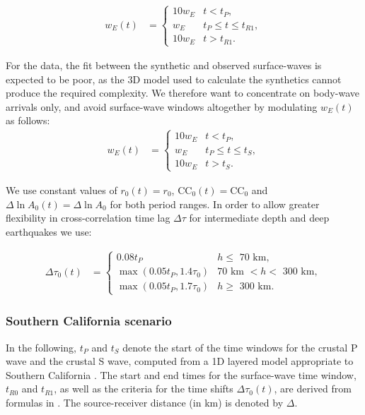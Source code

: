 %
\begin{align}
w_E(t) & =
  \begin{cases}
    10 w_E & \text{$t < t_P$}, \\
    w_E & \text{$t_P \le t \leq t_{R1}$}, \\
    10 w_E & \text{$t > t_{R1}$}.
  \end{cases}
\end{align}

For the  data, the fit between the synthetic and observed surface-waves is expected to be poor, as the 3D model used to calculate the synthetics cannot produce the required complexity. We therefore want to concentrate on body-wave arrivals only, and avoid surface-wave windows altogether by modulating $w_E(t)$ as follows:
%
\begin{align}
w_E(t) & =
  \begin{cases}
    10 w_E & \text{$t < t_P$}, \\
    w_E & \text{$t_P \le t \leq t_S$}, \\
    10 w_E & \text{$t > t_S$}.
  \end{cases}
\end{align}

We use constant values of $r_0(t)=r_0$, $\mathrm{CC}_0(t)=\mathrm{CC}_0$ and $\Delta \ln A_0(t)=\Delta \ln A_0$ for both period ranges.  In order to allow greater flexibility in cross-correlation time lag $\Delta\tau$ for intermediate depth and deep earthquakes we use:

\begin{align}
\Delta\tau_0(t) & = 
  \begin{cases}
    0.08 \text{$t_P$} & \text{$h \leq$ 70~km}, \\
    \max(0.05 \text{$t_P$}, 1.4\tau_0) & \text{70~km $< h <$ 300~km}, \\
    \max(0.05 \text{$t_P$}, 1.7\tau_0) & \text{$h \geq$ 300~km}.
  \end{cases}
\end{align}

\subsubsection{Southern California scenario\label{ap:user_socal}}

In the following, $t_P$ and $t_S$ denote the start of the time windows for the crustal P wave and the crustal S wave, computed from a 1D layered model appropriate to Southern California \citep{Wald95}.  The start and end times for the surface-wave time window, $t_{R0}$ and $t_{R1}$, as well as the criteria for the time shifts $\Delta\tau_0(t)$, are derived from formulas in \cite{KomatitschEtal2004}. The source-receiver distance (in km) is denoted by $\Delta$.

